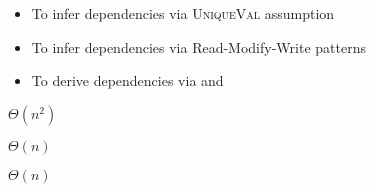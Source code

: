 \begin{frame}{}
	\begin{itemize}
		\item To infer \wrdep{} dependencies via \textsc{UniqueVal} assumption
		\item To infer \wwdep{} dependencies via Read-Modify-Write patterns
		\item To derive \rwdep{} dependencies via \wrdep{} and \wwdep
	\end{itemize}


	\pause
	\begin{description}
		\centering
		\item[\textsc{CheckSSER}:] $\Theta(n^2)$
		\item[\textsc{CheckSER}:] $\Theta(n)$
		\item[\textsc{CheckSI}:] $\Theta(n)$
	\end{description}
\end{frame}
